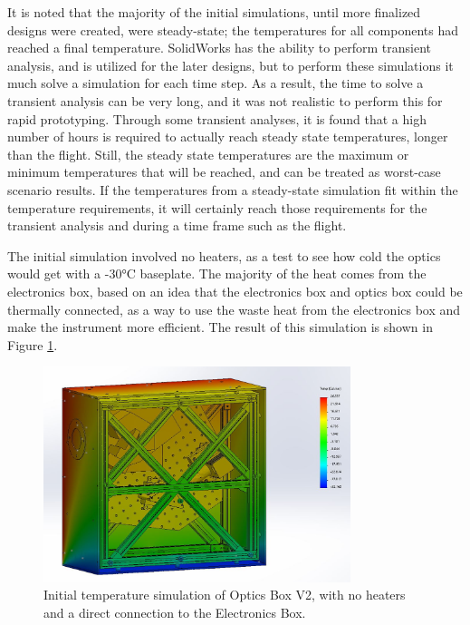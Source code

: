 It is noted that the majority of the initial simulations, until more finalized designs were created, were steady-state; the temperatures for all components had reached a final temperature. SolidWorks has the ability to perform transient analysis, and is utilized for the later designs, but to perform these simulations it much solve a simulation for each time step. As a result, the time to solve a transient analysis can be very long, and it was not realistic to perform this for rapid prototyping. Through some transient analyses, it is found that a high number of hours is required to actually reach steady state temperatures, longer than the flight. Still, the steady state temperatures are the maximum or minimum temperatures that will be reached, and can be treated as worst-case scenario results. If the temperatures from a steady-state simulation fit within the temperature requirements, it will certainly reach those requirements for the transient analysis and during a time frame such as the flight.

The initial simulation involved no heaters, as a test to see how cold the optics would get with a -30°C baseplate. The majority of the heat comes from the electronics box, based on an idea that the electronics box and optics box could be thermally connected, as a way to use the waste heat from the electronics box and make the instrument more efficient. The result of this simulation is shown in Figure \ref{fig:OB_V2_TA_1}. 

\begin{figure}
    \centering
    \includegraphics[width=0.8\textwidth]{chap3_images/LIFE_V2_images/Thermal_Analysis_25_deg_-30_deg.JPG}
    \caption{Initial temperature simulation of Optics Box V2, with no heaters and a direct connection to the Electronics Box.}
    \label{fig:OB_V2_TA_1}
\end{figure}

